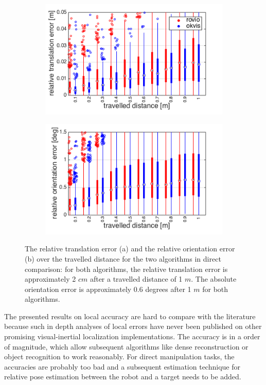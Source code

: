 \begin{figure}[h]
  \begin{subfigure}[b]{0.48\textwidth}
    \includegraphics[width=\textwidth]{images/ijrr/rte.png}
    \caption{}
    \label{fig:2}
  \end{subfigure}
  \hfill
  \begin{subfigure}[b]{0.48\textwidth}
    \includegraphics[width=\textwidth]{images/ijrr/roe.png}
    \caption{}
    \label{fig:2}
  \end{subfigure}
   \caption{The relative translation error (a) and the relative orientation error (b) over the travelled distance for the two algorithms in direct comparison: for both algorithms, the relative translation error is approximately 2 $cm$ after a travelled distance of 1 $m$. The absolute orientation error is approximately 0.6 degrees after 1 $m$ for both algorithms.}
   \label{pics:ijrr_rel}
\end{figure}

The presented results on local accuracy are hard to compare with the literature because such in depth analyses of local errors have never been published on other promising visual-inertial localization implementations. The accuracy is in a order of magnitude, which allow subsequent algorithms like dense reconstruction or object recognition to work reasonably. For direct manipulation tasks, the accuracies are probably too bad and a subsequent estimation technique for relative pose estimation between the robot and a target needs to be added.


